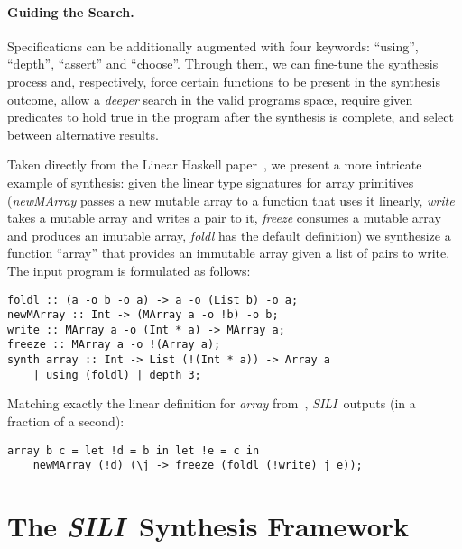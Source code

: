 \documentclass{llncs}
\newcommand{\mypara}[1]{\paragraph{\textbf{#1}.}}
\newcommand{\synname}{\emph{SILI}}
\begin{document}
\mypara{Guiding the Search} Specifications can be additionally
augmented with four keywords: ``using'', ``depth'', ``assert'' and ``choose''.
Through them, we can fine-tune the synthesis process and,
respectively, force certain functions to be present in the synthesis
outcome, allow a \emph{deeper} search in the valid programs space,
require given predicates to hold true in the program after the
synthesis is complete, and select between alternative results.

Taken directly from the Linear Haskell paper~\cite{Bernardy_2018}, we present a
more intricate example of synthesis: given the linear type signatures for array
primitives (\emph{newMArray} passes a new mutable array to a function that uses
it linearly, \emph{write} takes a mutable array and writes a pair to it,
\emph{freeze} consumes a mutable array and produces an imutable array,
\emph{foldl} has the default definition) we synthesize a function
``array'' that provides an immutable array given a list of pairs to write. The input program is formulated as
follows:
%
\begin{verbatim}
foldl :: (a -o b -o a) -> a -o (List b) -o a;
newMArray :: Int -> (MArray a -o !b) -o b;
write :: MArray a -o (Int * a) -> MArray a;
freeze :: MArray a -o !(Array a);
synth array :: Int -> List (!(Int * a)) -> Array a
    | using (foldl) | depth 3;
\end{verbatim}
%
Matching exactly the linear definition for
\emph{array} from~\cite{Bernardy_2018}, \synname\
outputs (in a fraction of a second):
%
\begin{verbatim}
array b c = let !d = b in let !e = c in
    newMArray (!d) (\j -> freeze (foldl (!write) j e));
\end{verbatim}

\section{The \synname\ Synthesis Framework}\label{sec:formal_system}


\end{document}
